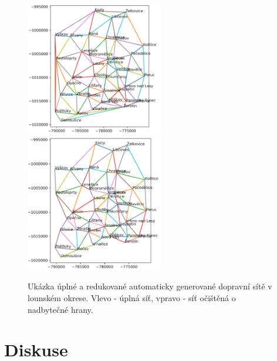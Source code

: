 


\begin{figure}
\centering
\includegraphics[width=60mm]{pic/doprava_01.png}
\includegraphics[width=60mm]{pic/doprava_02.png}
\caption{Ukázka úplné a redukované automaticky generované dopravní sítě v lounském okrese. Vlevo - úplná síť, vpravo - síť očištěná o nadbytečné hrany.}
\label{dopravnisit}
\end{figure}




\section*{Diskuse}


